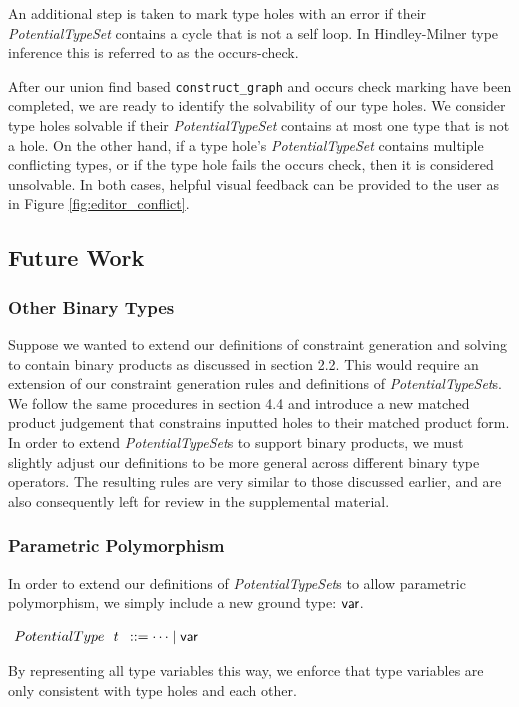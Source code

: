 An additional step is taken to mark type holes with an error if their \emph{PotentialTypeSet} contains a cycle that is not a self loop. In Hindley-Milner type inference this is referred to as the occurs-check.

After our union find based \lstinline{construct_graph} and occurs check marking have been completed, we are ready to identify the solvability of our type holes. We consider type holes solvable if their \textit{PotentialTypeSet} contains at most one type that is not a hole. On the other hand, if a type hole's \textit{PotentialTypeSet} contains multiple conflicting types, or if the type hole fails the occurs check, then it is considered unsolvable. In both cases, helpful visual feedback can be provided to the user as in Figure \ref{fig:editor_conflict}.

\subsection{Future Work}
\subsubsection{Other Binary Types}
Suppose we wanted to extend our definitions of constraint generation and solving to contain binary products as discussed in section 2.2. This would require an extension of our constraint generation rules and definitions of \emph{PotentialTypeSet}s. We follow the same procedures in section 4.4 and introduce a new matched product judgement that constrains inputted holes to their matched product form. In order to extend \emph{PotentialTypeSet}s to support binary products, we must slightly adjust our definitions to be more general across different binary type operators. The resulting rules are very similar to those discussed earlier, and are also consequently left for review in the supplemental material.

\subsubsection{Parametric Polymorphism}
In order to extend our definitions of \emph{PotentialTypeSet}s to allow parametric polymorphism, we simply include a new ground type: ${\normalfont\textsf{var}}$.
\begin{center}
$\arraycolsep=4pt\begin{array}{lll}
PotentialType~~ t & ::= 
  \dots \mid \TVar
\end{array}$
\end{center}
By representing all type variables this way, we enforce that type variables are only consistent with type holes and each other. 

